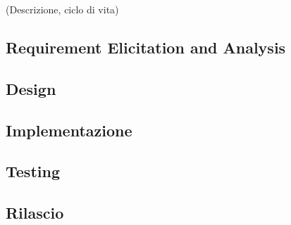 (Descrizione, ciclo di vita)

\subsection{Requirement Elicitation and Analysis}

\subsection{Design}

\subsection{Implementazione}

\subsection{Testing}

\subsection{Rilascio}